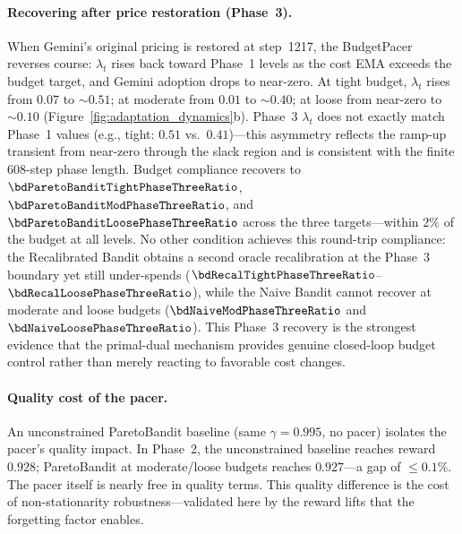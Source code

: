 \paragraph{Recovering after price restoration (Phase~3).}
When Gemini's original pricing is restored at step~1217, the BudgetPacer reverses course: $\lambda_t$ rises back toward Phase~1 levels as the cost EMA exceeds the budget target, and Gemini adoption drops to near-zero.
At tight budget, $\lambda_t$ rises from $0.07$ to ${\sim}0.51$; at moderate from $0.01$ to ${\sim}0.40$; at loose from near-zero to ${\sim}0.10$ (Figure~\ref{fig:adaptation_dynamics}b).
Phase~3 $\lambda_t$ does not exactly match Phase~1 values (e.g., tight: $0.51$ vs.\ $0.41$)---this asymmetry reflects the ramp-up transient from near-zero through the slack region and is consistent with the finite 608-step phase length.
Budget compliance recovers to $\bdParetoBanditTightPhaseThreeRatio$, $\bdParetoBanditModPhaseThreeRatio$, and $\bdParetoBanditLoosePhaseThreeRatio$ across the three targets---within $2\%$ of the budget at all levels.
No other condition achieves this round-trip compliance: the Recalibrated Bandit obtains a second oracle recalibration at the Phase~3 boundary yet still under-spends ($\bdRecalTightPhaseThreeRatio$--$\bdRecalLoosePhaseThreeRatio$), while the Naive Bandit cannot recover at moderate and loose budgets ($\bdNaiveModPhaseThreeRatio$ and $\bdNaiveLoosePhaseThreeRatio$).
This Phase~3 recovery is the strongest evidence that the primal-dual mechanism provides genuine closed-loop budget control rather than merely reacting to favorable cost changes.

\paragraph{Quality cost of the pacer.}
An unconstrained ParetoBandit baseline (same $\gamma{=}0.995$, no pacer) isolates the pacer's quality impact.
In Phase~2, the unconstrained baseline reaches reward $0.928$; ParetoBandit at moderate/loose budgets reaches $0.927$---a gap of ${\leq}0.1\%$.
The pacer itself is nearly free in quality terms.
This quality difference is the cost of non-stationarity robustness---validated here by the reward lifts that the forgetting factor enables.

